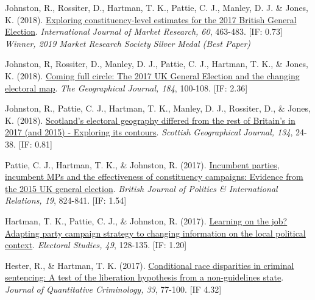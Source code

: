 \documentclass[12pt]{article}
\begin{document}
\begin{bibenum}
	\item Johnston, R., Rossiter, D., {Hartman, T. K.}, Pattie, C. J., 
		   Manley, D. J. \&  Jones, K. (2018). 
		  \href{https://10.1177/1470785318778247}
		  {Exploring constituency-level estimates for the 2017 British General Election}.
		  \emph{International Journal of Market Research, 60}, 463-483. [IF: 0.73]\\
		  \textit{Winner, 2019 Market Research Society Silver Medal (Best Paper)}

	\item Johnston, R, Rossiter, D., Manley, D. J., Pattie, C. J., 
		  {Hartman, T. K.}, \& Jones, K. (2018).
		  \href{https://10.1111/geoj.12240}
		  {Coming full circle: 
		  The 2017 UK General Election and the changing electoral map}. 
		  \emph{The Geographical Journal, 184}, 100-108. [IF: 2.36]
          
	\item Johnston, R., Pattie, C. J., {Hartman, T. K.}, Manley, D. J., 
		  Rossiter, D., \& Jones, K. (2018).
		  \href{https://10.1080/14702541.2017.1409362}
		  {Scotland's electoral geography 
		  differed from the rest of Britain's in 2017 (and 2015) - 
		  Exploring its contours}. 
		  \emph{Scottish Geographical Journal, 134}, 24-38. [IF: 0.81]
          
    \item Pattie, C. J., {Hartman, T. K.}, \& Johnston, R. (2017).
          \href{https://10.1177/1369148117718710}
          {Incumbent parties, incumbent MPs and the effectiveness of 
          constituency campaigns: Evidence from the 2015 UK general election}.
           \emph{British Journal of Politics \& International Relations, 19}, 824-841. [IF: 1.54]
          
    \item {Hartman, T. K.}, Pattie, C. J., \& Johnston, R. (2017).
    		\href{https://10.1016/j.electstud.2017.06.005}
          {Learning on the job? Adapting party campaign strategy 
          to changing information on the local political context}. 
          \emph{Electoral Studies, 49}, 128-135. [IF: 1.20]
          
    \item Hester, R., \& {Hartman, T. K.} (2017). 
          \href{https://10.1007/s10940-016-9283-z}
          {Conditional race disparities in criminal sentencing: 
          A test of the liberation hypothesis from a non-guidelines state}. 
          \emph{Journal of Quantitative Criminology, 33}, 77-100. [IF 4.32]
          

\end{bibenum}
\end{document}
